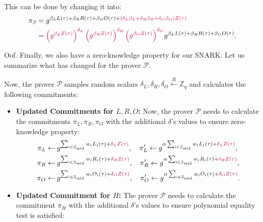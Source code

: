 \documentclass[../lecture-notes-148x210.tex]{subfiles}
\begin{document}
This can be done by changing it into:
\begin{align*}
    \pi_{\beta} &= g^{\beta_LL(\tau) + \beta_RR(\tau) + \beta_OO(\tau) + \textcolor{purple}{(\delta_L\beta_L + \delta_R\beta_R + \delta_O\beta_O)Z(\tau)}} \\&= \textcolor{purple}{\left(g^{\beta_L Z(\tau)}\right)^{\delta_L}\left(g^{\beta_R Z(\tau)}\right)^{\delta_R}\left(g^{\beta_O Z(\tau)}\right)^{\delta_O}}g^{\beta_LL(\tau) + \beta_RR(\tau) + \beta_OO(\tau)}.
\end{align*}

Oof. Finally, we also have a zero-knowledge property for our SNARK. Let us summarize what has changed for the prover $\mathcal{P}$.

\begin{proposition}
    Now, the prover $\mathcal{P}$ samples random scalars $\delta_L, \delta_R, \delta_O \xleftarrow{R} \mathbb{Z}_q$ and calculates the following commitments:
    \begin{itemize}
        \item \textbf{Updated Commitments for $L,R,O$:} Now, the prover $\mathcal{P}$ needs to calculate the commitments $\pi_L,\pi_R,\pi_O$ with the additional $\delta$'s values to ensure zero-knowledge property:
        \begin{align*}
            \pi_L &\gets g^{\sum_{i \in \mathcal{I}_{\text{mid}}}w_iL_i(\tau) + \textcolor{purple}{\delta_LZ(\tau)}}, \quad \pi_L' \gets g^{\alpha\sum_{i \in \mathcal{I}_{\text{mid}}}w_iL_i(\tau) + \textcolor{purple}{\delta_LZ(\tau)}}, \\
            \pi_R &\gets g^{\sum_{i \in \mathcal{I}_{\text{mid}}}w_iR_i(\tau) + \textcolor{purple}{\delta_RZ(\tau)}}, \quad \pi_R' \gets g^{\alpha\sum_{i \in \mathcal{I}_{\text{mid}}}w_iR_i(\tau) + \textcolor{purple}{\delta_RZ(\tau)}}, \\
            \pi_O &\gets g^{\sum_{i \in \mathcal{I}_{\text{mid}}}w_iO_i(\tau) + \textcolor{purple}{\delta_OZ(\tau)}}, \quad \pi_O' \gets g^{\alpha\sum_{i \in \mathcal{I}_{\text{mid}}}w_iO_i(\tau) + \textcolor{purple}{\delta_OZ(\tau)}}.
        \end{align*}
        \item \textbf{Updated Commitment for $H$:} The prover $\mathcal{P}$ needs to calculate the commitment $\pi_H$ with the additional $\delta$'s values to ensure polynomial equality test is satisfied:
        \begin{equation*}
            \begin{aligned}

\end{aligned}
\end{equation*}
\end{itemize}
\end{proposition}
\end{document}
